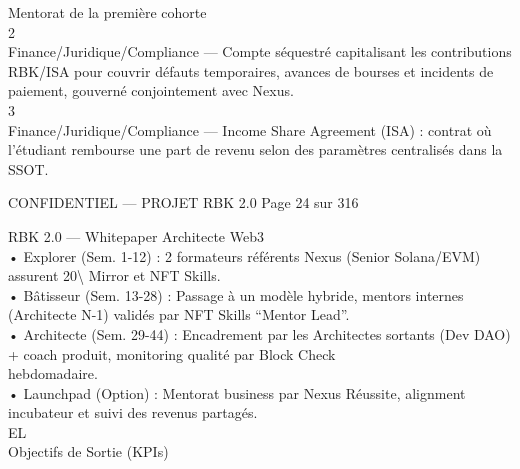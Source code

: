 Mentorat de la première cohorte\\
2\\
Finance/Juridique/Compliance — Compte séquestré capitalisant les contributions RBK/ISA pour couvrir défauts temporaires, avances de bourses et incidents de\\
paiement, gouverné conjointement avec Nexus.\\
3\\
Finance/Juridique/Compliance — Income Share Agreement (ISA) : contrat où l’étudiant rembourse une part de revenu selon des paramètres centralisés dans la\\
SSOT.\\
\vspace{0.5em}
\vspace{0.5em}
\vspace{0.5em}
\begin{confidential}CONFIDENTIEL — PROJET RBK 2.0                                          Page 24 sur 316\end{confidential}
RBK 2.0 — Whitepaper Architecte Web3\\
\vspace{0.5em}
\vspace{0.5em}
\vspace{0.5em}
• Explorer (Sem. 1-12) : 2 formateurs référents Nexus (Senior Solana/EVM) assurent 20\textbackslash{}%
Mirror et NFT Skills.\\
\vspace{0.5em}
• Bâtisseur (Sem. 13-28) : Passage à un modèle hybride, mentors internes (Architecte N-1) validés par NFT Skills “Mentor Lead”.\\
\vspace{0.5em}
• Architecte (Sem. 29-44) : Encadrement par les Architectes sortants (Dev DAO) + coach produit, monitoring qualité par Block Check\\
hebdomadaire.\\
\vspace{0.5em}
• Launchpad (Option) : Mentorat business par Nexus Réussite, alignment incubateur et suivi des revenus partagés.\\
\vspace{0.5em}
\vspace{0.5em}
\vspace{0.5em}
\vspace{0.5em}
EL\\
Objectifs de Sortie (KPIs)\\
